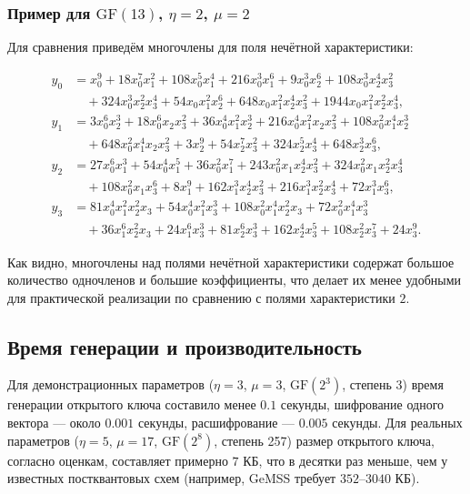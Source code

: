 \subsubsection{Пример для $\mathrm{GF}(13)$, $\eta=2$, $\mu=2$}

Для сравнения приведём многочлены для поля нечётной характеристики:

\begin{align*}
y_0 &= x_0^9 + 18x_0^7x_1^2 + 108x_0^5x_1^4 + 216x_0^3x_1^6 + 9x_0^3x_2^6 + 108x_0^3x_2^4x_3^2 \\
    &\quad + 324x_0^3x_2^2x_3^4 + 54x_0x_1^2x_2^6 + 648x_0x_1^2x_2^4x_3^2 + 1944x_0x_1^2x_2^2x_3^4,\\
y_1 &= 3x_0^6x_2^3 + 18x_0^6x_2x_3^2 + 36x_0^4x_1^2x_2^3 + 216x_0^4x_1^2x_2x_3^2 + 108x_0^2x_1^4x_2^3 \\
    &\quad + 648x_0^2x_1^4x_2x_3^2 + 3x_2^9 + 54x_2^7x_3^2 + 324x_2^5x_3^4 + 648x_2^3x_3^6,\\
y_2 &= 27x_0^6x_1^3 + 54x_0^4x_1^5 + 36x_0^2x_1^7 + 243x_0^2x_1x_2^4x_3^2 + 324x_0^2x_1x_2^2x_3^4 \\
    &\quad + 108x_0^2x_1x_3^6 + 8x_1^9 + 162x_1^3x_2^4x_3^2 + 216x_1^3x_2^2x_3^4 + 72x_1^3x_3^6,\\
y_3 &= 81x_0^4x_1^2x_2^2x_3 + 54x_0^4x_1^2x_3^3 + 108x_0^2x_1^4x_2^2x_3 + 72x_0^2x_1^4x_3^3 \\
    &\quad + 36x_1^6x_2^2x_3 + 24x_1^6x_3^3 + 81x_2^6x_3^3 + 162x_2^4x_3^5 + 108x_2^2x_3^7 + 24x_3^9.
\end{align*}

Как видно, многочлены над полями нечётной характеристики содержат большое количество одночленов и большие коэффициенты, что делает их менее удобными для практической реализации по сравнению с полями характеристики $2$.

\subsection{Время генерации и производительность}

Для демонстрационных параметров ($\eta=3$, $\mu=3$, $\mathrm{GF}(2^3)$, степень 3) время генерации открытого ключа составило менее $0.1$ секунды, шифрование одного вектора — около $0.001$ секунды, расшифрование — $0.005$ секунды. Для реальных параметров ($\eta=5$, $\mu=17$, $\mathrm{GF}(2^8)$, степень 257) размер открытого ключа, согласно оценкам, составляет примерно $7$ КБ, что в десятки раз меньше, чем у известных постквантовых схем (например, GeMSS требует $352$–$3040$ КБ).
